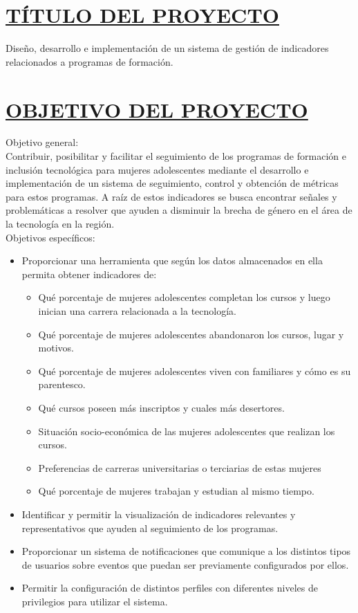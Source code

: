 \section*{\underline{TÍTULO DEL PROYECTO}}
Diseño, desarrollo e implementación de un sistema de gestión de indicadores relacionados a programas de formación.\\


\section*{\underline{OBJETIVO DEL PROYECTO}}
Objetivo general:\\

Contribuir, posibilitar y facilitar el seguimiento de los programas de formación e inclusión tecnológica para mujeres adolescentes mediante el desarrollo e implementación de un sistema de seguimiento, control y obtención de métricas para estos programas.
A raíz de estos indicadores se busca encontrar señales y problemáticas a resolver que ayuden a disminuir la brecha de género en el área de la tecnología en la región.\\

Objetivos específicos:
\begin{itemize}
	\item Proporcionar una herramienta que según los datos almacenados en ella permita obtener indicadores de:
	\begin{itemize}
	\item Qué porcentaje de mujeres adolescentes completan los cursos y luego inician una carrera relacionada a la tecnología.
	\item Qué porcentaje de mujeres adolescentes abandonaron los cursos, lugar y motivos.
	\item Qué porcentaje de mujeres adolescentes viven con familiares y cómo es su parentesco.
	\item Qué cursos poseen más inscriptos y cuales más desertores.
	\item Situación socio-económica de las mujeres adolescentes que realizan los cursos.
	\item Preferencias de carreras universitarias o terciarias de estas mujeres
	\item Qué porcentaje de mujeres trabajan y estudian al mismo tiempo.
	\end{itemize}
	\item Identificar y permitir la visualización de indicadores relevantes y representativos que ayuden al seguimiento de los programas.
	\item Proporcionar un sistema de notificaciones que comunique a los distintos tipos de usuarios sobre eventos que puedan ser previamente configurados por ellos.
	\item Permitir la configuración de distintos perfiles con diferentes niveles de privilegios para utilizar el sistema.\\
\end{itemize}


